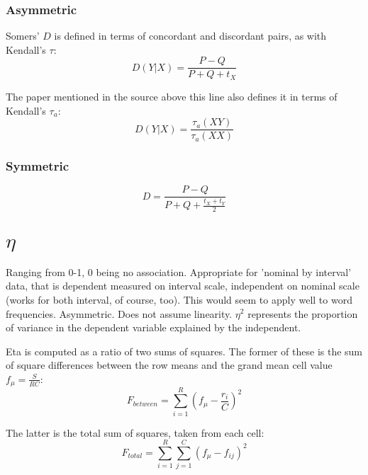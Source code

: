 \documentclass[11pt]{article}
\begin{document}
\subsubsection{Asymmetric}
Somers' $D$ is defined in terms of concordant and discordant pairs, as with Kendall's $\tau$:
$$
D(Y|X) = \frac{ P - Q }{ P + Q + t_X }
$$

The paper mentioned in the source above this line also defines it in terms of Kendall's $\tau_a$:
$$
D(Y|X) = \frac{ \tau_a(XY) }{  \tau_a(XX) }
$$

\subsubsection{Symmetric}
$$
D = \frac{ P - Q } { P + Q + \frac{ t_X + t_Y }{ 2 } }
$$






\section{$\eta$}
Ranging from 0-1, 0 being no association.  Appropriate for 'nominal by interval' data, that is dependent measured on interval scale, independent on nominal scale (works for both interval, of course, too).  This would seem to apply well to word frequencies.  Asymmetric.  Does not assume linearity.  $\eta^2$ represents the proportion of variance in the dependent variable explained by the independent.  

Eta is computed as a ratio of two sums of squares.  The former of these is the sum of square differences between the row means and the grand mean cell value $f_\mu = \frac{S}{RC}$:
$$
F_{between} = \sum_{i=1}^{R}{    \left(   f_\mu -   \frac {r_i}{C} \right)^2  }
$$

The latter is the total sum of squares, taken from each cell:
$$
F_{total} = \sum_{i=1}^{R}{ \sum_{j=1}^{C}{   ( f_\mu - f_{ij} )^2    } }
$$
\end{document}
